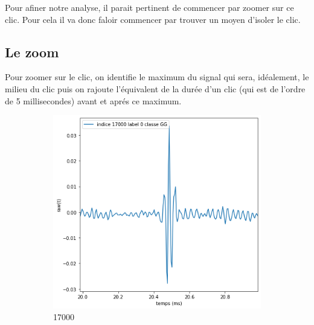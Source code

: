 Pour afiner notre analyse, il parait pertinent de commencer par zoomer sur ce clic.
Pour cela il va donc faloir commencer par trouver un moyen d'isoler le clic.

\hypertarget{Le-zoom}{%
\subsection{Le zoom}
\label{Le-zoom}}

Pour zoomer sur le clic, on identifie le maximum du signal qui sera, idéalement, le milieu du clic puis on rajoute l'équivalent de la durée d'un clic (qui est de l'ordre de 5 millisecondes) avant et aprés ce maximum.


\begin{figure}[!h]
  \centering
  \begin{subfigure}[b]{0.3\textwidth}
    \includegraphics[width=\textwidth]{./images/indice17000Spectro1Dlabel0classeGGsansprocessingaveczoom.png}
    \caption{17000}
  \end{subfigure}
  \begin{subfigure}[b]{0.3\textwidth}

\end{subfigure}
\end{figure}
